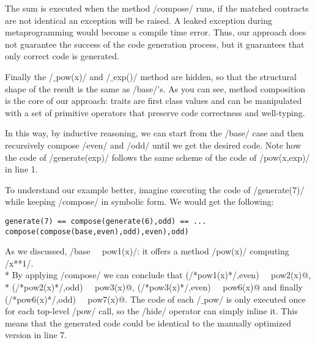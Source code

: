 The sum is executed when the method /compose/ runs, if the matched contracts are not identical an exception will be raised. A leaked exception during metaprogramming would become a compile time error. 
Thus, our approach does not guarantee the success of the code generation process, but it guarantees that only correct code is generated.

Finally the /$\_$pow(x)/ and /$\_$exp()/ method are hidden, so that the structural shape of the result is
the same as /base/'s.
As you can see, method composition is the core of our approach: traits are first class values and can be manipulated with a set of primitive operators that preserve code correctness and well-typing.

In this way, by inductive reasoning, we can start from the /base/ case and then recursively compose /even/ and /odd/ until we get the desired code.
Note how the code of /generate(exp)/ follows the same scheme of the code of /pow(x,exp)/ in line 1.

To understand our example better, imagine executing the code of /generate(7)/ while keeping /compose/ in symbolic form. We would get the following:
\begin{lstlisting}[numbers=none]
generate(7) == compose(generate(6),odd) == ...
compose(compose(base,even),odd),even),odd)
\end{lstlisting}
As we discussed, /base ~$\ $ pow1(x)/: it offers a method /pow(x)/ computing /x**1/.\\* By applying /compose/ we can conclude that 
\Q@compose(/*pow1(x)*/,even) ~$\ $ pow2(x)@,\\*
\Q@compose(/*pow2(x)*/,odd) ~$\ $ pow3(x)@,
\Q@compose(/*pow3(x)*/,even) ~$\ $ pow6(x)@ and finally
\Q@compose(/*pow6(x)*/,odd) ~$\ $ pow7(x)@.
The code of each /$\_$pow/ is only executed once for each top-level /pow/ call, so the /hide/ operator can simply inline it.
This means that the generated code could be identical to the manually optimized version in line 7.

